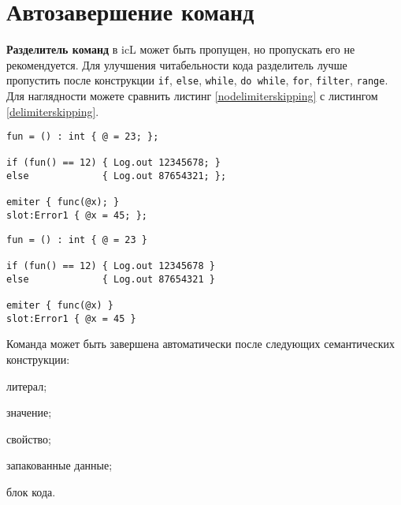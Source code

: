 \section{Автозавершение команд}

\textbf{Разделитель команд} в icL может быть пропущен, но пропускать его не рекомендуется. Для улучшения читабельности кода разделитель лучше пропустить после конструкции \texttt{if}, \texttt{else}, \texttt{while}, \texttt{do while}, \texttt{for}, \texttt{filter}, \texttt{range}. Для наглядности можете сравнить листинг \ref{nodelimiterskipping} с листингом \ref{delimiterskipping}.

\begin{sourcecode}
\label{nodelimiterskipping}
\begin{verbatim}
fun = () : int { @ = 23; };

if (fun() == 12) { Log.out 12345678; } 
else             { Log.out 87654321; };

emiter { func(@x); }
slot:Error1 { @x = 45; };
\end{verbatim}
\end{sourcecode}

\begin{sourcecode}
\label{delimiterskipping}
\begin{verbatim}
fun = () : int { @ = 23 }

if (fun() == 12) { Log.out 12345678 } 
else             { Log.out 87654321 }

emiter { func(@x) }
slot:Error1 { @x = 45 }
\end{verbatim}
\end{sourcecode}

Команда может быть завершена автоматически после следующих семантических конструкции:
\begin{icItems}
	\item литерал;
	\item значение;
	\item свойство;
	\item запакованные данные;
	\item блок кода.
\end{icItems}